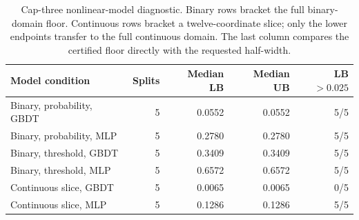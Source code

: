 \begin{table}[t]
\centering
\caption{Cap-three nonlinear-model diagnostic. Binary rows bracket the full binary-domain floor. Continuous rows bracket a twelve-coordinate slice; only the lower endpoints transfer to the full continuous domain. The last column compares the certified floor directly with the requested half-width.}
\label{tab:nonlineardetail}
\small
\setlength{\tabcolsep}{4pt}
\begin{tabular}{lrrrr}
\toprule
Model condition & Splits & Median LB & Median UB & LB$>0.025$ \\
\midrule
Binary, probability, GBDT & 5 & 0.0552 & 0.0552 & 5/5 \\
Binary, probability, MLP & 5 & 0.2780 & 0.2780 & 5/5 \\
Binary, threshold, GBDT & 5 & 0.3409 & 0.3409 & 5/5 \\
Binary, threshold, MLP & 5 & 0.6572 & 0.6572 & 5/5 \\
Continuous slice, GBDT & 5 & 0.0065 & 0.0065 & 0/5 \\
Continuous slice, MLP & 5 & 0.1286 & 0.1286 & 5/5 \\
\bottomrule
\end{tabular}
\end{table}
